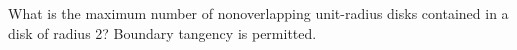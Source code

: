 What is the maximum number of nonoverlapping unit-radius disks contained in a disk of radius 2? Boundary tangency is permitted.
